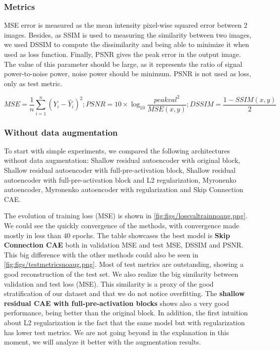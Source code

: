 \subsubsection{Metrics}

MSE error is measured as the mean intensity pixel-wise squared error between 2 images. Besides, as SSIM is used to measuring the similarity between two images, we used DSSIM to compute the dissimilarity and being able to minimize it when used as loss function. Finally, PSNR gives the peak error in the output image. The value of this parameter should be large, as it represents the ratio of signal power-to-noise power, noise power should be minimum. PSNR is not used as loss, only as test metric. 

$$MSE = \frac{1}{n} \sum^{n}_{i=1}(Y_i-\hat{Y}_i)^2; PSNR=10\times \log_{10}\frac{peakval^2}{MSE(x,y)}; DSSIM = \frac{1-SSIM(x,y)}{2}$$


\subsubsection{Without data augmentation}

To start with simple experiments, we compared the following architectures without data augmentation: Shallow residual autoencoder with original block,  Shallow residual autoencoder with full-pre-activation block, Shallow residual autoencoder with full-pre-activation block and L2 regularization, Myronenko autoencoder, Myronenko autoencoder with regularization and Skip Connection CAE.


The evolution of training loss (MSE) is shown in \ref{fig:figs/lossvaltrainnoaug.png}. We could see the quickly convergence of the methods, with convergence made mostly in less than 40 epochs. The table \label{table:expnodaug} showcases the best model is \textbf{Skip Connection CAE} both in validation MSE and test MSE, DSSIM and PSNR. This big difference with the other methods could also be seen in \ref{fig:figs/testmetricsnoaug.png}. Most of test metrics are outstanding, showing a good reconstruction of the test set. We also realize the big similarity between validation and test loss (MSE). This similarity is a proxy of the good stratification of our dataset and that we do not notice overfitting. The \textbf{shallow residual CAE with full-pre-activation blocks} shows also a very good performance, being better than the original block. In addition, the first intuition about L2 regularization is the fact that the same model but with regularization has lower test metrics. We are not going beyond in the explanation in this moment, we will analyze it better with the augmentation results.


